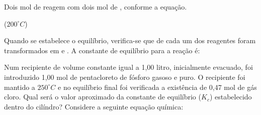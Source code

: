 \documentclass[a4paper,12]{exam}
\begin{document}
\begin{multicols}{2}
\begin{questions}
				\question Dois mol de  reagem com dois mol de , conforme a equação.
				\begin{center}
					 ($200^{\circ}C$)
				\end{center}
				Quando se estabelece o equilíbrio, verifica-se que  de cada um dos reagentes foram transformados em  e . A constante de equilíbrio para a reação é:
				\makeemptybox{2cm}

				\question Num recipiente de volume constante igual a 1,00 litro, inicialmente evacuado, foi introduzido 1,00 mol de pentacloreto de fósforo gasoso e puro. O recipiente foi mantido a $250^{\circ}C$ e no equilíbrio final foi verificada a existência de 0,47 mol de gás cloro. Qual será o valor aproximado da constante de equilíbrio ($K_c$) estabelecido dentro do cilíndro? Considere a seguinte equação química:
				\begin{center}
				\end{center}
				\makeemptybox{2cm}







	\end{questions}
\end{multicols}
\end{document}
